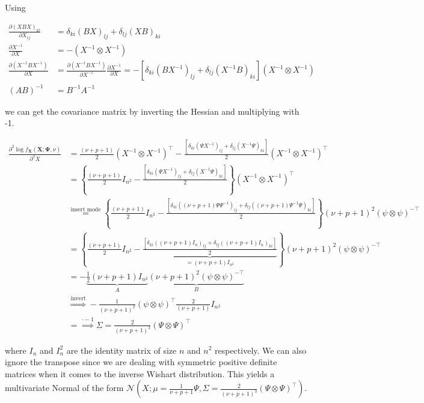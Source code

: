 Using 

\begin{align}
	\frac{\partial(XBX)_{kl}}{\partial X_{ij}} &= \delta_{ki}(BX)_{lj} + \delta_{lj}(XB)_{ki} \\
	\frac{\partial X^{-1}}{\partial X} &= -(X^{-1} \otimes X^{-1}) \\
	\frac{\partial (X^{-1}B X^{-1})}{\partial X} &= \frac{\partial (X^{-1}B X^{-1})}{\partial X^{-1}} \frac{\partial X^{-1}}{\partial X} = -[\delta_{ki}(BX^{-1})_{lj} + \delta_{lj}(X^{-1}B)_{ki}] (X^{-1} \otimes X^{-1})\\
	(AB)^{-1} &= B^{-1} A^{-1}
\end{align}

we can get the covariance matrix by inverting the Hessian and multiplying with -1. 

\begin{subequations}
\begin{align}
		\frac{\partial^2 \log f_{\mathbf X}({\mathbf X}; {\mathbf \Psi}, \nu)}{\partial^2 X} &= \frac{(\nu + p + 1)}{2}(X^{-1} \otimes X^{-1})^\top - \frac{[\delta_{ki}(\Psi X^{-1})_{lj} + \delta_{lj}(X^{-1}\Psi)_{ki}]}{2} (X^{-1} \otimes X^{-1})^\top \\
		&= \left\{\frac{(\nu + p + 1)}{2} I_{n^2}- \frac{[\delta_{ki}(\Psi X^{-1})_{lj} + \delta_{lj}(X^{-1}\Psi)_{ki}]}{2}\right\} (X^{-1} \otimes X^{-1})^\top \\
		&\overset{\text{insert mode}}{=} \left\{\frac{(\nu + p + 1)}{2} I_{n^2}- \frac{[\delta_{ki}((\nu + p + 1)\Psi \Psi^{-1})_{lj} + \delta_{lj}((\nu + p + 1)\Psi^{-1}\Psi)_{ki}]}{2}\right\} (\nu + p + 1)^2(\psi \otimes \psi)^{-\top} \\
		&= \left\{\frac{(\nu + p + 1)}{2} I_{n^2}- \underbrace{\frac{[\delta_{ki}((\nu + p + 1)I_n)_{lj} + \delta_{lj}((\nu + p + 1)I_n)_{ki}]}{2}}_{=(\nu + p + 1)I_{n^2}}\right\} (\nu + p + 1)^2(\psi \otimes \psi)^{-\top} \\
		&= -\underbrace{\frac{1}{2}(\nu + p + 1) I_{n^2}}_{A} \underbrace{(\nu + p + 1)^2(\psi \otimes \psi)^{-\top}}_{B} \\
		&\overset{\text{invert}}{\Rightarrow} -\frac{1}{(\nu + p + 1)^2}(\psi \otimes \psi)^{\top} \frac{2}{(\nu + p + 1)}I_{n^2} \\
		&=\overset{\cdot -1}{\Rightarrow} \Sigma = \frac{2}{(\nu + p + 1)^3}(\Psi \otimes \Psi)^\top
\end{align}
\end{subequations}

where $I_{n}$ and $I_n^2$ are the identity matrix of size $n$ and $n^2$ respectively. We can also ignore the transpose since we are dealing with symmetric positive definite matrices when it comes to the inverse Wishart distribution. This yields a multivariate Normal of the form $\mathcal{N}\left(X; \mu = \frac{1}{\nu + p + 1} \Psi, \Sigma = \frac{2}{(\nu + p + 1)^3}(\Psi \otimes \Psi)^\top\right)$. 

